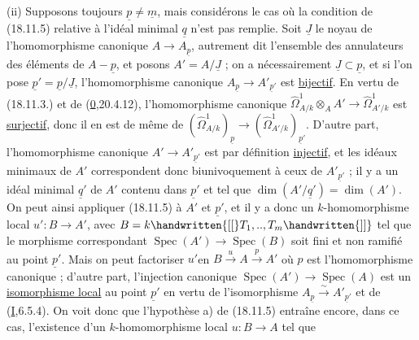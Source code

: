 (ii) Supposons toujours $\underline{p}\ne\underline{m}$, mais considérons le cas où la condition de (18.11.5) relative à  l'idéal minimal $\underline{q}$ n'est pas remplie. Soit $\underline{J}$ le noyau de l'homomorphisme canonique $A\to A_{\underline{p}}$, autrement dit l'ensemble des annulateurs des éléments de $A-\underline{p}$, et posons $A'=A/\underline{J}$ ; on a nécessairement $\underline{J}\subset\underline{p}$, et si l'on pose $\underline{p}'=\underline{p}/\underline{J}$, l'homomorphisme canonique $A_{\underline{p}}\to A'_{\underline{p}'}$ est \uline{bijectif}. En vertu de (18.11.3.) et de (\uline{0},20.4.12), l'homomorphisme canonique  $\widehat{\Omega}^1_{A/k}\otimes_A A'\to\widehat{\Omega}^1_{A'/k}$ est \uline{surjectif}, donc il en est de même de $(\widehat{\Omega}^1_{A/k})_{\underline{p}}\to(\widehat{\Omega}^1_{A'/k})_{\underline{p}'}$. D'autre part, l'homomorphisme canonique $A'\to A'_{\underline{p}'}$ est par définition \uline{injectif}, et les idéaux  minimaux de $A'$ correspondent donc biunivoquement à ceux de $A'_{\underline{p}'}$ ;
  il y a un idéal minimal $\underline{q}'$ de $A'$  contenu dans  $\underline{p}'$ et tel que $\dim(A'/\underline{q}')=\dim(A')$. On peut ainsi appliquer (18.11.5) à $A'$ et $\underline{p}'$, et il y a donc un $k$-homomorphisme local $u':B\to A'$, avec $B=k\handwritten{[[}T_1,..,T_m\handwritten{]]}$ tel que le morphisme correspondant   $\operatorname{Spec}(A')\to\operatorname{Spec}(B)$ soit fini et non ramifié au point $\underline{p}'$. Mais on peut factoriser $u'$en $B\xrightarrow{u}A\xrightarrow{p}A'$ où  $p$ est l'homomorphisme canonique ; d'autre part, l'injection canonique $\operatorname{Spec}(A')\to\operatorname{Spec}(A)$ est un  \uline{isomorphisme local} au point $\underline{p}'$ en vertu de l'isomorphisme $A_{\underline{p}}\xrightarrow{\sim}A'_{\underline{p}'}$ et de (\uline{I},6.5.4). On voit donc que l'hypothèse a) de (18.11.5) entraîne encore, dans ce cas, l'existence d'un $k$-homomorphisme local $u:B\to A$ tel que


